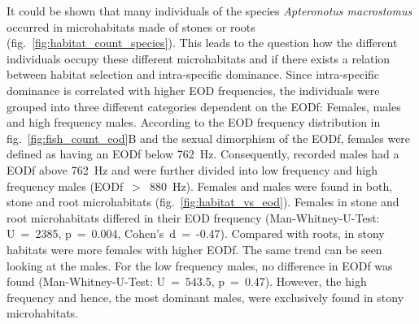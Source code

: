 It could be shown that many individuals of the species \textit{Apteronotus macrostomus} occurred in microhabitats made of stones or roots (fig.~\ref{fig:habitat_count_species}). This leads to the question how the different individuals occupy these different microhabitats and if there exists a relation between habitat selection and intra-specific dominance. Since intra-specific dominance is correlated with higher EOD frequencies, the individuals were grouped into three different categories dependent on the EODf: Females, males and high frequency males. According to the EOD frequency distribution in fig.~\ref{fig:fish_count_eod}B and the sexual dimorphism of the EODf, females were defined as having an EODf below 762~Hz. Consequently, recorded males had a EODf above 762~Hz and were further divided into low frequency and high frequency males (EODf~$>$~880~Hz).
Females and males were found in both, stone and root microhabitats (fig.~\ref{fig:habitat_vs_eod}). 
Females in stone and root microhabitats differed in their EOD frequency (Man-Whitney-U-Test: U~=~2385, p~=~0.004, Cohen's~d~=~-0.47). Compared with roots, in stony habitats were more females with higher EODf. The same trend can be seen looking at the males. For the low frequency males, no difference in EODf was found (Man-Whitney-U-Test: U~=~543.5, p~=~0.47). However, the high frequency and hence, the most dominant males, were exclusively found in stony microhabitats.